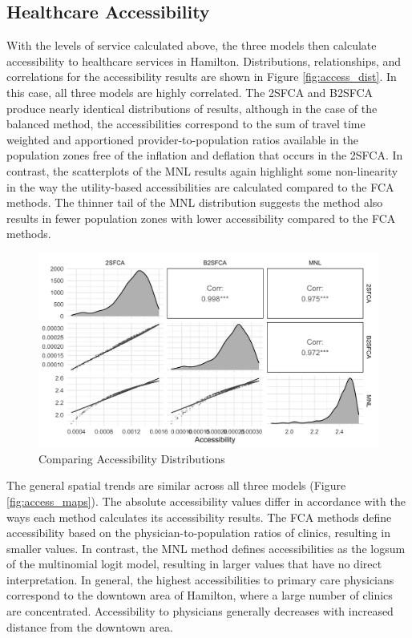 \documentclass[]{elsarticle} %
\begin{document}
\hypertarget{healthcare-accessibility}{%
\subsection{Healthcare Accessibility}\label{healthcare-accessibility}}

With the levels of service calculated above, the three models then
calculate accessibility to healthcare services in Hamilton.
Distributions, relationships, and correlations for the accessibility
results are shown in Figure \ref{fig:access_dist}. In this case, all
three models are highly correlated. The 2SFCA and B2SFCA produce nearly
identical distributions of results, although in the case of the balanced
method, the accessibilities correspond to the sum of travel time
weighted and apportioned provider-to-population ratios available in the
population zones free of the inflation and deflation that occurs in the
2SFCA. In contrast, the scatterplots of the MNL results again highlight
some non-linearity in the way the utility-based accessibilities are
calculated compared to the FCA methods. The thinner tail of the MNL
distribution suggests the method also results in fewer population zones
with lower accessibility compared to the FCA methods.

\begin{figure}
\includegraphics[width=1\linewidth]{./img/pair_plot_access} \caption{\label{fig:access_dist}Comparing Accessibility Distributions}\label{fig:access_dist_fig}
\end{figure}

The general spatial trends are similar across all three models (Figure
\ref{fig:access_maps}). The absolute accessibility values differ in
accordance with the ways each method calculates its accessibility
results. The FCA methods define accessibility based on the
physician-to-population ratios of clinics, resulting in smaller values.
In contrast, the MNL method defines accessibilities as the logsum of the
multinomial logit model, resulting in larger values that have no direct
interpretation. In general, the highest accessibilities to primary care
physicians correspond to the downtown area of Hamilton, where a large
number of clinics are concentrated. Accessibility to physicians
generally decreases with increased distance from the downtown area.
\end{document}
